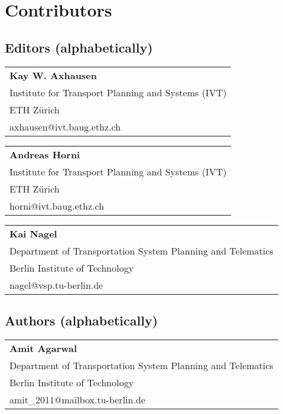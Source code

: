 \chapter*{Contributors}
\section*{Editors (alphabetically)}
\begin{tabular}[width=0.48\textwidth]{l}
\textbf{Kay W. Axhausen} \\
Institute for Transport Planning and Systems (IVT) \\
ETH Zürich \\
axhausen@ivt.baug.ethz.ch \\
\end{tabular}

\begin{tabular}[width=0.48\textwidth]{l}
\textbf{Andreas Horni} \\
Institute for Transport Planning and Systems (IVT) \\
ETH Zürich \\
horni@ivt.baug.ethz.ch \\
\end{tabular}

\begin{tabular}[width=0.48\textwidth]{l}
\textbf{Kai Nagel} \\
Department of Transportation System Planning and Telematics \\
Berlin Institute of Technology \\
nagel@vsp.tu-berlin.de \\
\end{tabular}

\section*{Authors (alphabetically)}

\begin{tabular}[width=0.48\textwidth]{l}
\textbf{Amit Agarwal} \\
Department of Transportation System Planning and Telematics \\
Berlin Institute of Technology \\
amit\_2011@mailbox.tu-berlin.de \\
\end{tabular}

